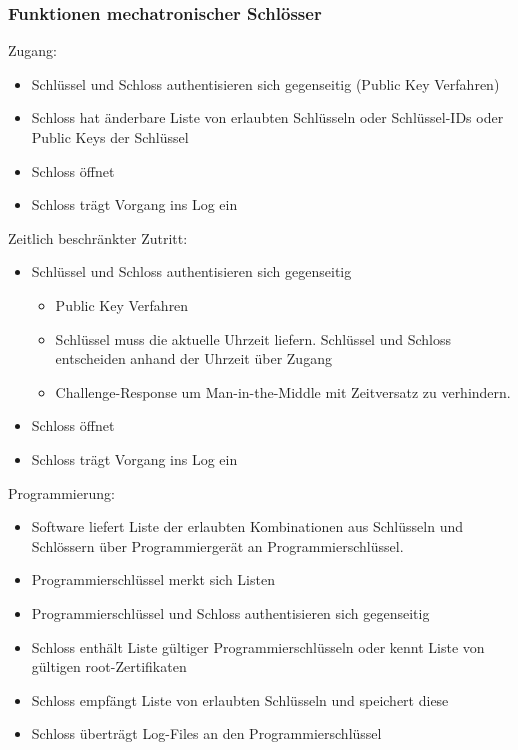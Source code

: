 \documentclass{article} %
\begin{document}
\subsubsection{Funktionen mechatronischer Schlösser}
Zugang:
\begin{itemize}
	\item Schlüssel und Schloss authentisieren sich gegenseitig (Public Key Verfahren)
    \item Schloss hat änderbare Liste von erlaubten Schlüsseln oder Schlüssel-IDs oder Public Keys der Schlüssel
    \item Schloss öffnet
    \item Schloss trägt Vorgang ins Log ein
\end{itemize}
Zeitlich beschränkter Zutritt:
\begin{itemize}
	\item Schlüssel und Schloss authentisieren sich gegenseitig
    
    \begin{itemize}
        \item Public Key Verfahren
        \item Schlüssel muss die aktuelle Uhrzeit liefern. Schlüssel und Schloss entscheiden anhand der Uhrzeit über Zugang
        \item Challenge-Response um Man-in-the-Middle mit Zeitversatz zu verhindern.
    \end{itemize}
    \item Schloss öffnet
    \item Schloss trägt Vorgang ins Log ein
\end{itemize}
Programmierung:
\begin{itemize}
	\item Software liefert Liste der erlaubten Kombinationen aus Schlüsseln und Schlössern über Programmiergerät an Programmierschlüssel.
    \item Programmierschlüssel merkt sich Listen
    \item Programmierschlüssel und Schloss authentisieren sich gegenseitig
    \item Schloss enthält Liste gültiger Programmierschlüsseln oder kennt Liste von gültigen root-Zertifikaten
    \item Schloss empfängt Liste von erlaubten Schlüsseln und speichert diese
    \item Schloss überträgt Log-Files an den Programmierschlüssel
\end{itemize}
\end{document}
